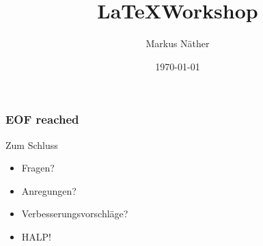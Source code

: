 \documentclass[dvips,mathserif]{beamer}
\begin{document}
\title{\LaTeX Workshop}
\author{Markus Näther}
\date{\today}

\begin{frame}
	\titlepage
\end{frame}


\frame{\tableofcontents[part=1,pausesections]}






\begin{frame}
  \frametitle{EOF reached}

  \begin{block}{Zum Schluss}
    \begin{itemize}[<+->]
      \item Fragen?
      \item Anregungen?
      \item Verbesserungsvorschläge?
      \item HALP!
    \end{itemize}
  \end{block}
\end{frame}
\end{document}
